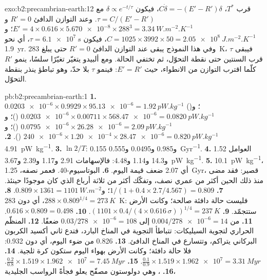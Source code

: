 \begin{solution}{exo:b2:precambrian-earth:12}
قرب $T^*$، $C\dot\delta = -(E' - R')\delta$، فيكون $\delta \propto e^{-t/\tau}$ مع $\tau =
C/(E' - R')$. وعند التوازن الدافئ $R' = 0$ و$E' = 4\times0.616\times\num{5.670e-8}\times
288^3 = \qty{3.34}{W.m^{-2}.K^{-1}}$؛ و$C = 1025\times3992\times50 = \qty{2.05e8}{J.m^{-2}.K^{-1}}$،
فيكون $\tau = \qty{6.1e7}{s}$، أي نحو \qty{1.9}{yr}. وفي هذا النموذج يبقى عند التوازن الدافئ $R' =
0$ حتى يبلغ \qty{283}{K}، فيبقى $\tau$ قرب السنتين حتى نقطة التحوّل، ثم
تختفي الحالة. ومع ألبيدو يتغيّر تغيّرًا سلسًا، ينمو $R'$ كلّما اقترب التوازن من
الانطواء، حيث $E' = R'$: فينمو $\tau$ بلا حدّ، وهو تباطؤ ينذر بنقطة
التحوّل.
\end{solution}

\begin{solution}{pb:b2:precambrian-earth:1}
\textbf{1.} $\num{0.0203e-6}\times0.9929\times\num{95.13e-6} = \qty{1.92}{pW.kg^{-1}}$
()؛ و$\num{0.0203e-6}\times0.00711\times\num{568.47e-6} = \qty{0.0820}{pW.kg^{-1}}$
()؛ و$\num{0.0795e-6}\times\num{26.28e-6} = \qty{2.09}{pW.kg^{-1}}$ ()؛
و$\num{240e-6}\times\num{1.20e-4}\times\num{28.47e-6} = \qty{0.820}{pW.kg^{-1}}$ ().
\textbf{2.} \qty{4.91}{pW.kg^{-1}}.
\textbf{3.} $\ln2/T$: 0.155 و0.985 و0.0495 و\qty{0.555}{Gyr^{-1}}.
\textbf{4.} العوامل 1.52 و14.3 و1.14 و4.48: فالإسهامات 2.91 و1.17 و2.39 و\qty{3.67}{pW.kg^{-1}}.
\textbf{5.} \qty{10.1}{pW.kg^{-1}}، أي 2.07 ضعف قيمة اليوم.
\textbf{6.} البوتاسيوم-40. فعمر نصفه، \qty{1.25}{Gyr}، قصير: فقد مضى منذ ذلك الحين أكثر من عمري نصف،
وتفكّك أكثر من ثلاثة أرباع  الذي كان موجودًا حينئذ.
\textbf{7.} $1/(1 + 0.4\times2.7/4.567) = 0.809$؛ و$0.809\times1361 = \qty{1101}{W.m^{-2}}$.
\textbf{8.} $288\times0.809^{1/4} = \qty{273}{K}$، أي دون \qty{283}{K}: فليست حالة دافئة صالحة؛
وكانت الأرض ستتجمّد.
\textbf{9.} $(1101\times0.4/(4\times0.616\,\sigma))^{1/4} = \qty{237}{K}$.
\textbf{10.} $0.616\times0.809 = 0.498$.
\textbf{11.} من $0.004/\num{278e-6} = 14$ إلى $0.03/\num{278e-6} = 108$ ضعفًا.
\textbf{12.} المنظّم الحراري لتجوية السيليكات: تتباطأ التجوية في المناخ البارد، فتدع
ثاني أكسيد الكربون البركاني يتراكم، وتتسارع في المناخ الدافئ.
\textbf{13.} 0.826 من ضوء اليوم، أي دون 0.932: فلا حالة دافئة؛ وكانت الأرض بهواء اليوم ستكون
كرة ثلجية.
\textbf{14.} $\frac{0.1}{0.9}\times1.519\times\num{1.962e7} = \qty{3.31}{Myr}$.
\textbf{15.} $\frac{0.2}{0.8}\times1.519\times\num{1.962e7} = \qty{7.45}{Myr}$.
\textbf{16.} ، وهي دولوستون مصفّح يعلو فجأةً الرواسب الجليدية،

\end{solution}
